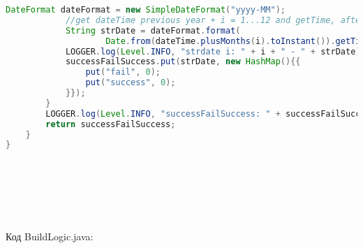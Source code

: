\begin{lstlisting}[language=Java]
            DateFormat dateFormat = new SimpleDateFormat("yyyy-MM");
            //get dateTime previous year + i = 1...12 and getTime, after in strDate=2022-03
            String strDate = dateFormat.format(
                    Date.from(dateTime.plusMonths(i).toInstant()).getTime());
            LOGGER.log(Level.INFO, "strdate i: " + i + " - " + strDate);
            successFailSuccess.put(strDate, new HashMap(){{
                put("fail", 0);
                put("success", 0);
            }});
        }
        LOGGER.log(Level.INFO, "successFailSuccess: " + successFailSuccess.entrySet());
        return successFailSuccess;
    }
}








\end{lstlisting}

Код BuildLogic.java:

